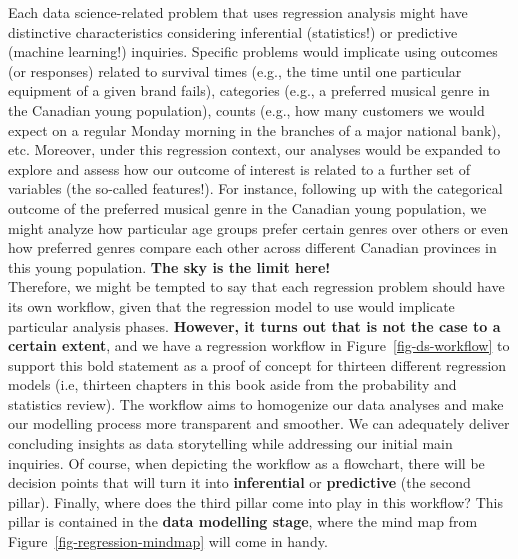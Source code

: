 \documentclass[
  letterpaper,
  DIV=11,
  numbers=noendperiod]{scrreprt}
\begin{document}
\begin{tcolorbox}[enhanced jigsaw, bottomrule=.15mm, breakable, colback=white, leftrule=.75mm, coltitle=black, rightrule=.15mm, bottomtitle=1mm, title={The Rationale Behind the Three Pillars}, opacitybacktitle=0.6, toprule=.15mm, titlerule=0mm, arc=.35mm, colbacktitle=quarto-callout-tip-color!10!white, toptitle=1mm, colframe=quarto-callout-tip-color-frame, left=2mm, opacityback=0]

Each data science-related problem that uses regression analysis might
have distinctive characteristics considering inferential (statistics!)
or predictive (machine learning!) inquiries. Specific problems would
implicate using outcomes (or responses) related to survival times (e.g.,
the time until one particular equipment of a given brand fails),
categories (e.g., a preferred musical genre in the Canadian young
population), counts (e.g., how many customers we would expect on a
regular Monday morning in the branches of a major national bank), etc.
Moreover, under this regression context, our analyses would be expanded
to explore and assess how our outcome of interest is related to a
further set of variables (the so-called features!). For instance,
following up with the categorical outcome of the preferred musical genre
in the Canadian young population, we might analyze how particular age
groups prefer certain genres over others or even how preferred genres
compare each other across different Canadian provinces in this young
population. \textbf{The sky is the limit here!}\\

Therefore, we might be tempted to say that each regression problem
should have its own workflow, given that the regression model to use
would implicate particular analysis phases. \textbf{However, it turns
out that is not the case to a certain extent}, and we have a regression
workflow in Figure~\ref{fig-ds-workflow} to support this bold statement
as a proof of concept for thirteen different regression models (i.e,
thirteen chapters in this book aside from the probability and statistics
review). The workflow aims to homogenize our data analyses and make our
modelling process more transparent and smoother. We can adequately
deliver concluding insights as data storytelling while addressing our
initial main inquiries. Of course, when depicting the workflow as a
flowchart, there will be decision points that will turn it into
\textbf{inferential} or \textbf{predictive} (the second pillar).
Finally, where does the third pillar come into play in this workflow?
This pillar is contained in the \textbf{data modelling stage}, where the
mind map from Figure~\ref{fig-regression-mindmap} will come in handy.

\end{tcolorbox}
\end{document}
